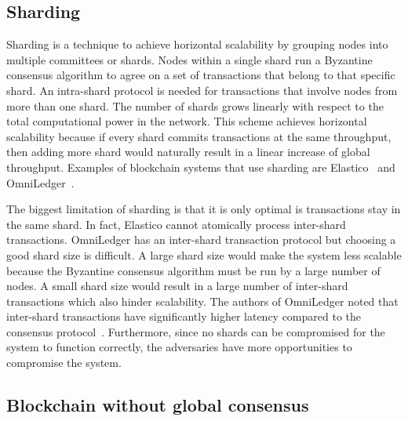 
\subsection{Sharding}

Sharding is a technique to achieve horizontal scalability by grouping nodes into multiple committees or shards.
Nodes within a single shard run a Byzantine consensus algorithm to agree on a set of transactions that belong to that specific shard.
An intra-shard protocol is needed for transactions that involve nodes from more than one shard.
The number of shards grows linearly with respect to the total computational power in the network.
This scheme achieves horizontal scalability because if every shard commits transactions at the same throughput,
then adding more shard would naturally result in a linear increase of global throughput.
Examples of blockchain systems that use sharding are Elastico~\cite{luu2016elastico} and OmniLedger~\cite{kokoris2017omniledger}.

The biggest limitation of sharding is that it is only optimal is transactions stay in the same shard.
In fact, Elastico cannot atomically process inter-shard transactions.
OmniLedger has an inter-shard transaction protocol but choosing a good shard size is difficult.
A large shard size would make the system less scalable because the Byzantine consensus algorithm must be run by a large number of nodes.
A small shard size would result in a large number of inter-shard transactions which also hinder scalability.
The authors of OmniLedger noted that inter-shard transactions have significantly higher latency compared to the consensus protocol~\cite{kokoris2017omniledger}.
Furthermore, since no shards can be compromised for the system to function correctly,
the adversaries have more opportunities to compromise the system.

\subsection{Blockchain without global consensus}


